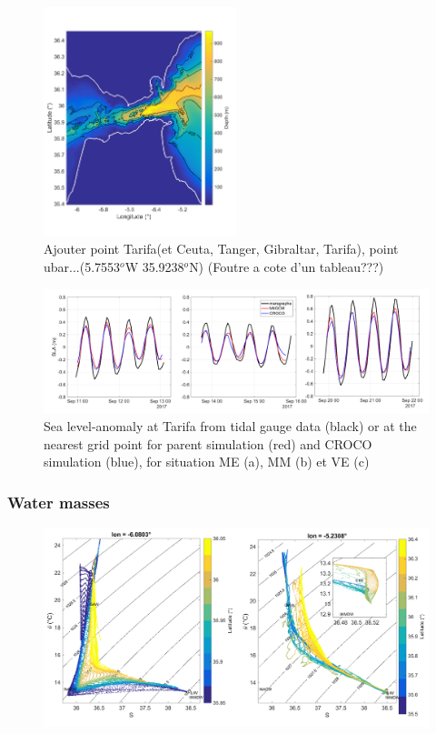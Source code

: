\begin{figure}[!h]
        \includegraphics[width=0.5\textwidth]{./GBR3D/FigBathyVHR.png}
        \caption{Ajouter point Tarifa(et Ceuta, Tanger, Gibraltar, Tarifa), point ubar...(5.7553$^o$W  35.9238$^o$N) (Foutre a cote d'un tableau???)}
        \label{FigBathy3D}
\end{figure}



\begin{figure}[!h]
        \includegraphics[width=\textwidth]{./GBR3D/SLA_Tarifa_ME2VE2IES.png}
        \caption{Sea level-anomaly at Tarifa from tidal gauge data (black) or at the nearest grid point for parent simulation (red) and CROCO simulation (blue), for situation ME (a), MM (b) et VE (c)}
        \label{fig_maree_tar}
\end{figure}

\subsubsection{Water masses}


\begin{figure}[!h]
        \includegraphics[width=\textwidth]{./GBR3D/WM_ini_IES.png}
        \label{Fig_Ini_WM3D}
\end{figure}


